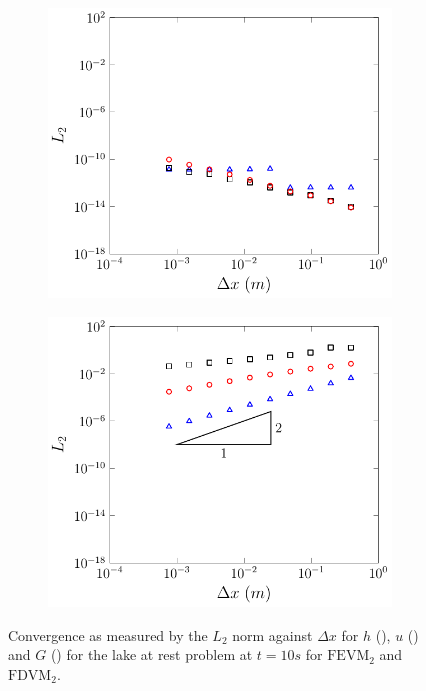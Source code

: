 \begin{figure}
\begin{subfigure}{0.5\textwidth}
		\vspace{0.3cm}
	\end{subfigure}
	\begin{subfigure}{0.5\textwidth}
		\includegraphics[width=\textwidth]{./chp5/figures/Analytic/LakeAtRest/L2/FDVMWB.pdf}
	\end{subfigure}%
	\begin{subfigure}{0.5\textwidth}
		\includegraphics[width=\textwidth]{./chp5/figures/Analytic/LakeAtRest/L2/FDVMnWB.pdf}
	\end{subfigure}
	\caption{Convergence as measured by the $L_2$ norm against $\Delta x$ for $h$ (), $u$ () and $G$ () for the lake at rest problem at $t=10s$ for $\text{FEVM}_2$ and $\text{FDVM}_2$.}
	\label{fig:LakeAtRestEL1}
\end{figure}

